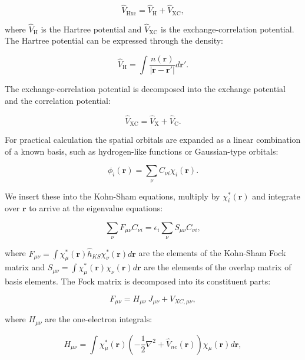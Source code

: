 \begin{equation}
\hat{V}_{\text{Hxc}} = \hat{V}_{\text{H}} + \hat{V}_{\text{XC}} ,
\end{equation}

where $\hat{V}_{\text{H}}$ is the Hartree potential and
$\hat{V}_{\text{XC}}$ is the exchange-correlation potential.
The Hartree potential can be expressed through the density:

\begin{equation}
\hat{V}_{\text{H}} = \int \frac{n(\bm{r})}{\left| \bm{r} -
    \bm{r}' \right|} d\bm{r}' .
\end{equation}

The exchange-correlation potential is decomposed
into the exchange potential and the correlation potential:

\begin{equation}
\hat{V}_{\text{XC}} = \hat{V}_{\text{X}} + \hat{V}_{\text{C}} .
\end{equation}

For practical calculation the 
spatial orbitals are expanded as a linear combination
of a known basis, such as hydrogen-like functions
or Gaussian-type orbitals:

$$ \phi_i(\bm{r}) = \sum_{\nu} C_{\nu i} \chi_i (\bm{r}) . $$

We insert these into the Kohn-Sham equations, multiply
by $\chi_i^*(\bm{r})$ and integrate over $\bm{r}$ to arrive
at the eigenvalue equations:

$$ \sum_{\nu} F_{\mu\nu} C_{\nu i} =
    \epsilon_i \sum_{\nu} S_{\mu\nu} C_{\nu i} , $$

where $F_{\mu\nu} = \int \chi_{\mu}^*(\bm{r}) \hat{h}_{KS}
\chi_{\nu}^*(\bm{r}) d\bm{r} $ are the elements of the Kohn-Sham
Fock matrix and $S_{\mu\nu} = \int \chi_{\mu}^*(\bm{r}) \chi_{\nu}
(\bm{r}) d\bm{r}$ are the elements of the overlap matrix
of basis elements.
The Fock matrix is decomposed into its constituent parts:

\begin{equation}
F_{\mu\nu} = H_{\mu\nu} \ J_{\mu\nu} + V_{XC,\mu\nu} ,
\end{equation}

where $H_{\mu\nu}$ are the one-electron integrals:

\begin{equation}
H_{\mu\nu} = \int \chi_{\mu}^*(\bm{r})
    \left( -\frac{1}{2} \nabla^2 + \hat{V}_{ne}(\bm{r}) \right)
    \chi_{\mu}(\bm{r}) d\bm{r} ,
\end{equation}

